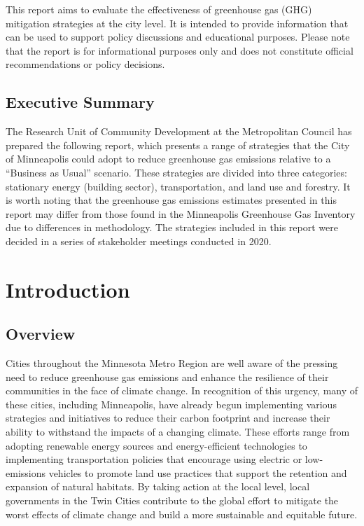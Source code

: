 \documentclass[
]{book}
\begin{document}
This report aims to evaluate the effectiveness of greenhouse gas (GHG) mitigation strategies at the city level. It is intended to provide information that can be used to support policy discussions and educational purposes. Please note that the report is for informational purposes only and does not constitute official recommendations or policy decisions.

\hypertarget{executive-summary}{%
\section*{Executive Summary}\label{executive-summary}}

The Research Unit of Community Development at the Metropolitan Council has prepared the following report, which presents a range of strategies that the City of Minneapolis could adopt to reduce greenhouse gas emissions relative to a ``Business as Usual'' scenario. These strategies are divided into three categories: stationary energy (building sector), transportation, and land use and forestry. It is worth noting that the greenhouse gas emissions estimates presented in this report may differ from those found in the Minneapolis Greenhouse Gas Inventory due to differences in methodology. The strategies included in this report were decided in a series of stakeholder meetings conducted in 2020.

\hypertarget{introduction}{%
\chapter{Introduction}\label{introduction}}

\hypertarget{overview}{%
\section{Overview}\label{overview}}

Cities throughout the Minnesota Metro Region are well aware of the pressing need to reduce greenhouse gas emissions and enhance the resilience of their communities in the face of climate change. In recognition of this urgency, many of these cities, including Minneapolis, have already begun implementing various strategies and initiatives to reduce their carbon footprint and increase their ability to withstand the impacts of a changing climate. These efforts range from adopting renewable energy sources and energy-efficient technologies to implementing transportation policies that encourage using electric or low-emissions vehicles to promote land use practices that support the retention and expansion of natural habitats. By taking action at the local level, local governments in the Twin Cities contribute to the global effort to mitigate the worst effects of climate change and build a more sustainable and equitable future.
\end{document}

